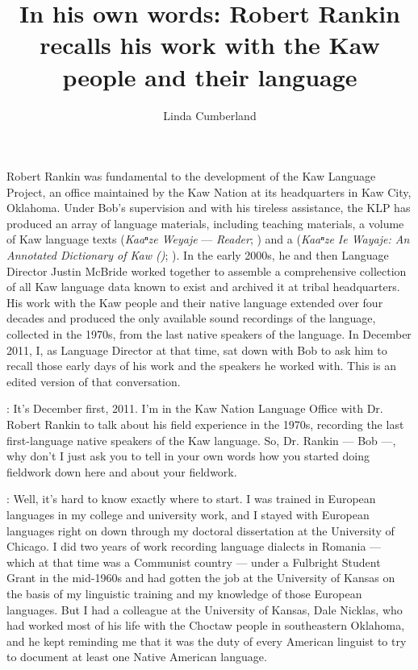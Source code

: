 \documentclass[output=paper]{LSP/langsci}
\author{Linda Cumberland}
\title{In his own words: {Robert Rankin} recalls his work with the {Kaw} people and their language}
\begin{document}
 
Robert Rankin was fundamental to the development of the Kaw Language Project, an office maintained by the Kaw Nation at its headquarters in Kaw City, Oklahoma. Under Bob's supervision and with his tireless assistance, the KLP has produced an array of language materials, including teaching materials, a volume of Kaw language texts (\textit{Kaaⁿze Weyaje} --- \textit{ Reader}; \citealt{KanzaLP2010}) and a  (\textit{Kaaⁿze Ie Wayaje: An Annotated Dictionary of Kaw ()}; \citealt{CumberlandRankin2012}). In the early 2000s, he and then Language Director Justin McBride worked together to assemble a comprehensive collection of all Kaw language data known to exist and archived it at tribal headquarters. His work with the Kaw people and their native language extended over four decades and produced the only available sound recordings of the language, collected in the 1970s, from the last native speakers of the language. In December 2011, I, as Language Director at that time, sat down with Bob to ask him to recall those early days of his work and the speakers he worked with. This is an edited version of that conversation.
 

: It's December first, 2011. I'm in the Kaw Nation Language Office with Dr. Robert Rankin to talk about his field experience in the 1970s, recording the last first-language native speakers of the Kaw language. So, Dr. Rankin --- Bob ---, why don't I just ask you to tell in your own words how you started doing fieldwork down here and about your fieldwork. 

:  Well, it's hard to know exactly where to start. I was trained in European languages in my college and university work, and I stayed with European languages right on down through my doctoral dissertation at the University of Chicago. I did two years of work recording  language dialects in Romania --- which at that time was a Communist country --- under a Fulbright Student Grant in the mid-1960s and had gotten the job at the University of Kansas on the basis of my linguistic training and my knowledge of those European languages. But I had a colleague at the University of Kansas, Dale Nicklas, who had worked most of his life with the Choctaw people in southeastern Oklahoma, and he kept reminding me that it was the duty of every American linguist to try to document at least one Native American language. 
\end{document}
